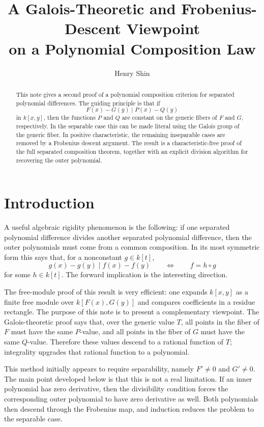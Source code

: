 \documentclass[12pt]{article}
\title{\textbf{A Galois-Theoretic and Frobenius-Descent Viewpoint\\ on a Polynomial Composition Law}}
\author{Henry Shin}
\date{}
\begin{document}
\maketitle

\begin{abstract}
This note gives a second proof of a polynomial composition criterion for separated polynomial differences.  The guiding principle is that if
\[
    F(x)-G(y) \mid P(x)-Q(y)
\]
in \(k[x,y]\), then the functions \(P\) and \(Q\) are constant on the generic fibers of \(F\) and \(G\), respectively.  In the separable case this can be made literal using the Galois group of the generic fiber.  In positive characteristic, the remaining inseparable cases are removed by a Frobenius descent argument.  The result is a characteristic-free proof of the full separated composition theorem, together with an explicit division algorithm for recovering the outer polynomial.
\end{abstract}

\section{Introduction}

A useful algebraic rigidity phenomenon is the following: if one separated polynomial difference divides another separated polynomial difference, then the outer polynomials must come from a common composition.  In its most symmetric form this says that, for a nonconstant \(g\in k[t]\),
\[
    g(x)-g(y)\mid f(x)-f(y)
    \qquad\Longleftrightarrow\qquad
    f=h\circ g
\]
for some \(h\in k[t]\).  The forward implication is the interesting direction.

The free-module proof of this result is very efficient: one expands \(k[x,y]\) as a finite free module over \(k[F(x),G(y)]\) and compares coefficients in a residue rectangle.  The purpose of this note is to present a complementary viewpoint.  The Galois-theoretic proof says that, over the generic value \(T\), all points in the fiber of \(F\) must have the same \(P\)-value, and all points in the fiber of \(G\) must have the same \(Q\)-value.  Therefore these values descend to a rational function of \(T\); integrality upgrades that rational function to a polynomial.

This method initially appears to require separability, namely \(F'\neq 0\) and \(G'\neq 0\).  The main point developed below is that this is not a real limitation.  If an inner polynomial has zero derivative, then the divisibility condition forces the corresponding outer polynomial to have zero derivative as well.  Both polynomials then descend through the Frobenius map, and induction reduces the problem to the separable case.
\end{document}
